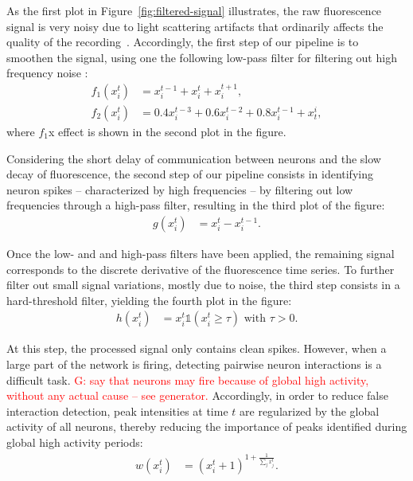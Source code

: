 \documentclass[wcp]{jmlr}
\begin{document}
As the first plot in Figure~\ref{fig:filtered-signal} illustrates, the raw
fluorescence signal is very noisy due to light scattering artifacts that
ordinarily affects the quality of the recording~\citep{lichtman2011big}.
Accordingly, the first step of our pipeline is to smoothen the signal, using
one the following low-pass filter for filtering out high frequency noise :
\begin{align}
f_1(x^t_i) &= x^{t-1}_i + x^{t}_i + x^{t+1}_i \label{eq:symetric-median}, \\
f_2(x^t_i) &= 0.4 x^{t-3}_i + 0.6 x^{t-2}_i + 0.8 x^{t-1}_i + x_{t}^i,
\label{eq:weighted-asymetric-median}
\end{align}
where $f_1$x effect is shown in the second plot in the figure.

Considering the short delay of communication between neurons and the slow
decay of fluorescence, the second step of our pipeline consists in identifying
neuron spikes -- characterized by high frequencies -- by filtering out low
frequencies through a high-pass filter, resulting in the third plot of the figure:
\begin{align} %
g(x^{t}_{i}) &= x^{t}_i - x^{t-1}_i. \label{eq:high-pass-filter}
\end{align}

Once the low- and and high-pass filters have been applied, the remaining signal
corresponds to the discrete derivative of the fluorescence time series. To
further filter out small signal variations, mostly due to noise, the third step
consists in a  hard-threshold filter, yielding the fourth plot in the figure:
\begin{align}
h(x^{t}_i) &= x^{t}_i \mathbb{1}(x^{t}_i \geq \tau) \text{ with } \tau > 0.
\end{align}

At this step, the processed signal only contains clean spikes. However, when a
large part of the network is firing, detecting pairwise neuron interactions is a
difficult task. \textcolor{red}{G: say that neurons may fire because of global
high activity, without any actual cause -- see generator.}
Accordingly, in order to reduce false interaction detection,
peak intensities at time $t$ are regularized by the global activity of all
neurons, thereby reducing the importance of peaks identified during global high activity periods:
\begin{align}
 w(x^{t}_i) &= (x^{t}_i + 1 )^{1 + \frac{1}{\sum_{j} x^{t}_j}}.
\end{align}
\end{document}
